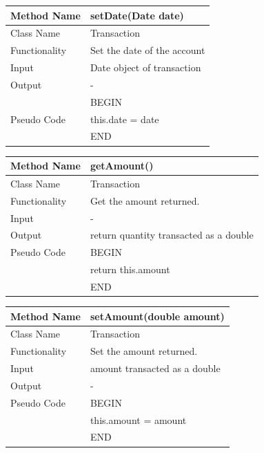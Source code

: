 \documentclass[12pt]{article}
\begin{document}
\begin{tabular}{ |p{3cm}||p{\colWidth}|  }
	\hline
	Method Name &  setDate(Date date) \\
	\hline
	Class Name & Transaction\\
	\hline
	Functionality &  Set the date of the account\\
	\hline
	Input & Date object of transaction\\
	\hline
	Output & -\\
	\hline& BEGIN \\
	Pseudo Code & this.date = date\\
	& END \\
	\hline
\end{tabular}



\begin{tabular}{ |p{3cm}||p{\colWidth}|  }
	\hline
	Method Name &  getAmount() \\
	\hline
	Class Name & Transaction\\
	\hline
	Functionality &  Get the amount returned.\\
	\hline
	Input & -\\
	\hline
	Output & return quantity transacted as a double\\
	\hline
	Pseudo Code& BEGIN \\ & return this.amount\\ & END \\
	\hline
\end{tabular}



\begin{tabular}{ |p{3cm}||p{\colWidth}|  }
	\hline
	Method Name &  setAmount(double amount) \\
	\hline
	Class Name & Transaction\\
	\hline
	Functionality &  Set the amount returned.\\
	\hline
	Input & amount transacted as a double\\
	\hline
	Output & -\\
	\hline
	Pseudo Code & BEGIN \\& this.amount = amount\\ & END\\
	\hline
\end{tabular}


\pagebreak
\end{document}

